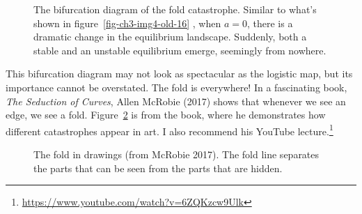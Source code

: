 \documentclass[
  a4paper,
  DIV=11,
  numbers=noendperiod,
  oneside]{scrreprt}
\begin{document}
\begin{figure}


\caption{\label{fig-ch3-img5-old-17}The bifurcation diagram of the fold
catastrophe. Similar to what's shown in figure~\ref{fig-ch3-img4-old-16}
, when \(a=0\), there is a dramatic change in the equilibrium landscape.
Suddenly, both a stable and an unstable equilibrium emerge, seemingly
from nowhere.}

\end{figure}%

This bifurcation diagram may not look as spectacular as the logistic
map, but its importance cannot be overstated. The fold is everywhere! In
a fascinating book, \emph{The Seduction of Curves}, Allen McRobie (2017)
shows that whenever we see an edge, we see a fold.
Figure~\ref{fig-ch3-img6-old-18} is from the book, where he demonstrates
how different catastrophes appear in art. I also recommend his YouTube
lecture.\footnote{\url{https://www.youtube.com/watch?v=6ZQKzcw9Ulk}}

\begin{figure}


\caption{\label{fig-ch3-img6-old-18}The fold in drawings (from McRobie
2017). The fold line separates the parts that can be seen from the parts
that are hidden.}

\end{figure}%
\end{document}
